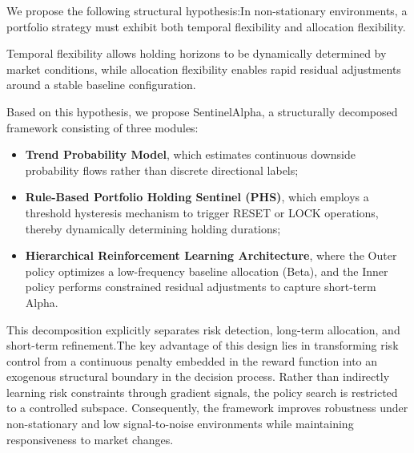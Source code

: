 \documentclass[letterpaper]{article} %
\begin{document}
We propose the following structural hypothesis:In non-stationary environments, a portfolio strategy must exhibit both temporal flexibility and allocation flexibility.

Temporal flexibility allows holding horizons to be dynamically determined by market conditions, while allocation flexibility enables rapid residual adjustments around a stable baseline configuration.

Based on this hypothesis, we propose SentinelAlpha, a structurally decomposed framework consisting of three modules:
\begin{itemize}
    \item \textbf{Trend Probability Model}, which estimates continuous downside probability flows rather than discrete directional labels;
    \item \textbf{Rule-Based Portfolio Holding Sentinel (PHS)}, which employs a threshold hysteresis mechanism to trigger RESET or LOCK operations, thereby dynamically determining holding durations;
    \item \textbf{Hierarchical Reinforcement Learning Architecture}, where the Outer policy optimizes a low-frequency baseline allocation (Beta), and the Inner policy performs constrained residual adjustments to capture short-term Alpha.
\end{itemize}

This decomposition explicitly separates risk detection, long-term allocation, and short-term refinement.The key advantage of this design lies in transforming risk control from a continuous penalty embedded in the reward function into an exogenous structural boundary in the decision process. Rather than indirectly learning risk constraints through gradient signals, the policy search is restricted to a controlled subspace. Consequently, the framework improves robustness under non-stationary and low signal-to-noise environments while maintaining responsiveness to market changes.
\end{document}
